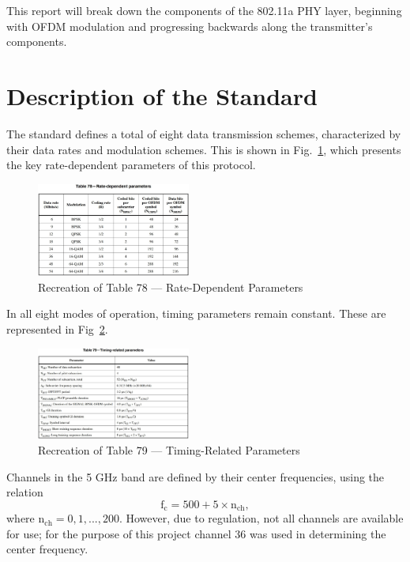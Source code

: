 \documentclass[journal]{IEEEtran}
\begin{document}
This report will break down the components of the 802.11a PHY layer, beginning with OFDM modulation and progressing backwards along the transmitter's components.

\section{Description of the Standard} \label{sec:standard_components}
The standard defines a total of eight data transmission schemes, characterized by their data rates and modulation schemes. This is shown in Fig.~\ref{fig:rate_params}, which presents the key rate-dependent parameters of this protocol.
\begin{figure}
    \centering
    \includegraphics[width = 0.45\textwidth]{RateDepParams}
    \caption{Recreation of Table 78 --- Rate-Dependent Parameters}
    \label{fig:rate_params}
\end{figure}

In all eight modes of operation, timing parameters remain constant. These are represented in Fig~\ref{fig:time_params}.
\begin{figure}
    \centering
    \includegraphics[width = 0.45\textwidth]{TimeDepParams}
    \caption{Recreation of Table 79 --- Timing-Related Parameters}
    \label{fig:time_params}
\end{figure}

Channels in the 5 GHz band are defined by their center frequencies, using the relation
\begin{equation}
\text{f}_\text{c} = 500 + 5 \times \text{n}_\text{ch},
\end{equation}
where $\text{n}_\text{ch} = 0,1,...,200$. However, due to regulation, not all channels are available for use; for the purpose of this project channel 36 was used in determining the center frequency.
\end{document}
